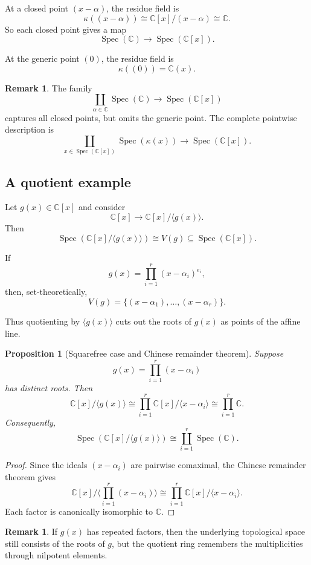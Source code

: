 \documentclass[11pt]{article}
\newtheorem{proposition}[theorem]{Proposition}
\theoremstyle{definition}
\newtheorem{remark}[theorem]{Remark}
\newcommand{\C}{\mathbb{C}}
\newcommand{\Spec}{\operatorname{Spec}}
\newcommand{\ideal}[1]{\langle #1\rangle}
\newcommand{\kk}[1]{\kappa\!\left(#1\right)}
\begin{document}
	At a closed point $(x-\alpha)$, the residue field is
	\[
	\kk{(x-\alpha)}\cong \C[x]/(x-\alpha)\cong \C.
	\]
	So each closed point gives a map
	\[
	\Spec(\C)\longrightarrow \Spec(\C[x]).
	\]
	
	At the generic point $(0)$, the residue field is
	\[
	\kk{(0)}=\C(x).
	\]
	
	\begin{remark}
		The family
		\[
		\coprod_{\alpha\in \C}\Spec(\C)\longrightarrow \Spec(\C[x])
		\]
		captures all closed points, but omits the generic point. The complete pointwise description is
		\[
		\coprod_{x\in \Spec(\C[x])}\Spec(\kk{x})\longrightarrow \Spec(\C[x]).
		\]
	\end{remark}
	
	\subsection{A quotient example}
	
	Let $g(x)\in \C[x]$ and consider
	\[
	\C[x]\longrightarrow \C[x]/\ideal{g(x)}.
	\]
	Then
	\[
	\Spec(\C[x]/\ideal{g(x)})\cong V(g)\subseteq \Spec(\C[x]).
	\]
	
	If
	\[
	g(x)=\prod_{i=1}^r (x-\alpha_i)^{e_i},
	\]
	then, set-theoretically,
	\[
	V(g)=\{(x-\alpha_1),\dots,(x-\alpha_r)\}.
	\]
	
	Thus quotienting by $\ideal{g(x)}$ cuts out the roots of $g(x)$ as points of the affine line.
	
	\begin{proposition}[Squarefree case and Chinese remainder theorem]
		Suppose
		\[
		g(x)=\prod_{i=1}^r (x-\alpha_i)
		\]
		has distinct roots. Then
		\[
		\C[x]/\ideal{g(x)}
		\cong
		\prod_{i=1}^r \C[x]/\ideal{x-\alpha_i}
		\cong
		\prod_{i=1}^r \C.
		\]
		Consequently,
		\[
		\Spec(\C[x]/\ideal{g(x)})
		\cong
		\coprod_{i=1}^r \Spec(\C).
		\]
	\end{proposition}
	
	\begin{proof}
		Since the ideals $(x-\alpha_i)$ are pairwise comaximal, the Chinese remainder theorem gives
		\[
		\C[x]/\ideal{\prod_{i=1}^r(x-\alpha_i)}
		\cong
		\prod_{i=1}^r \C[x]/\ideal{x-\alpha_i}.
		\]
		Each factor is canonically isomorphic to $\C$.
	\end{proof}
	
	\begin{remark}
		If $g(x)$ has repeated factors, then the underlying topological space still consists of the roots of $g$, but the quotient ring remembers the multiplicities through nilpotent elements.
	\end{remark}
	
\end{document}
